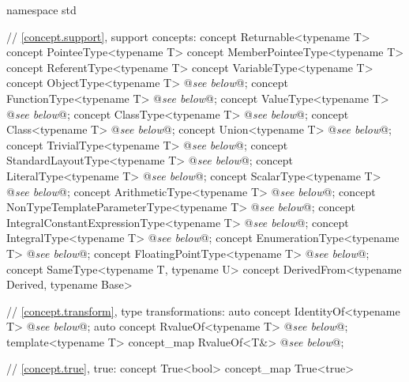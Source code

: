 \documentclass[american,twoside]{book}
\begin{document}
\begin{codeblock}
namespace std {
  // \ref{concept.support}, support concepts:
  concept Returnable<typename T> { }
  concept PointeeType<typename T> { }
  concept MemberPointeeType<typename T> { }
  concept ReferentType<typename T> { }
  concept VariableType<typename T> { }
  concept ObjectType<typename T> @\textit{see below}@;
  concept FunctionType<typename T> @\textit{see below}@;
  concept ValueType<typename T> @\textit{see below}@;
  concept ClassType<typename T> @\textit{see below}@;
  concept Class<typename T> @\textit{see below}@;
  concept Union<typename T> @\textit{see below}@;
  concept TrivialType<typename T> @\textit{see below}@;
  concept StandardLayoutType<typename T> @\textit{see below}@;
  concept LiteralType<typename T> @\textit{see below}@;
  concept ScalarType<typename T> @\textit{see below}@;
  concept ArithmeticType<typename T> @\textit{see below}@;
  concept NonTypeTemplateParameterType<typename T> @\textit{see below}@;
  concept IntegralConstantExpressionType<typename T> @\textit{see below}@;
  concept IntegralType<typename T> @\textit{see below}@;
  concept EnumerationType<typename T> @\textit{see below}@;
  concept FloatingPointType<typename T> @\textit{see below}@;
  concept SameType<typename T, typename U> {  }
  concept DerivedFrom<typename Derived, typename Base> { }

  // \ref{concept.transform}, type transformations:
  auto concept IdentityOf<typename T> @\textit{see below}@;
  auto concept RvalueOf<typename T> @\textit{see below}@;
  template<typename T> concept_map RvalueOf<T&> @\textit{see below}@;

  // \ref{concept.true}, true:
  concept True<bool> { }
  concept_map True<true> { }

}
\end{codeblock}
\end{document}
